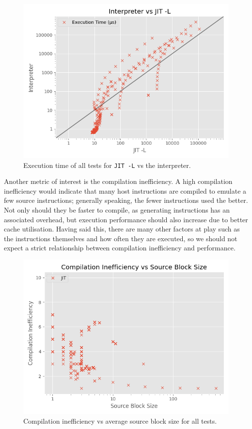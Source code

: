\begin{figure}[H]
    \centering
    \includegraphics[scale=0.75]{output/graphs/scatter/vs/JIT -L-vs-Interpreter-time.png}
    \caption{Execution time of all tests for \texttt{JIT -L} vs the interpreter.}
    \label{figure:jit-l-vs-interpreter}
\end{figure}

Another metric of interest is the compilation inefficiency. A high compilation inefficiency would indicate that many host instructions are compiled to emulate a few source instructions; generally speaking, the fewer instructions used the better. Not only should they be faster to compile, as generating instructions has an associated overhead, but execution performance should also increase due to better cache utilisation. Having said this, there are many other factors at play such as the instructions themselves and how often they are executed, so we should not expect a strict relationship between compilation inefficiency and performance.

\begin{figure}[H]
    \centering
    \includegraphics[scale=0.75]{output/graphs/scatter/single/jit/c-efficiency-vs-hotness.png}
    \caption{Compilation inefficiency vs average source block size for all tests.}
    \label{figure:jit-c-inefficiency-size}
\end{figure}

